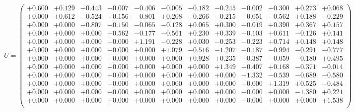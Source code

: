 \documentclass[9pt]{article}
\theoremstyle{plain}
\theoremstyle{definition}
\theoremstyle{remark}
\numberwithin{equation}{section}
\begin{document}
$U = \left(
\begin{array}{
cccccccccccc}
+0.600 & +0.129 & -0.443 & -0.007 & -0.406 & -0.005 & -0.182 & -0.245 & -0.002 & -0.300 & +0.273 & +0.068 \\
+0.000 & +0.612 & -0.524 & +0.156 & -0.801 & +0.208 & -0.266 & -0.215 & +0.051 & -0.562 & +0.188 & -0.229 \\
+0.000 & +0.000 & -0.807 & -0.150 & -0.065 & -0.128 & +0.065 & +0.300 & +0.019 & +0.390 & +0.367 & +0.157 \\
+0.000 & +0.000 & +0.000 & +0.562 & -0.177 & -0.561 & +0.230 & +0.339 & +0.103 & +0.611 & -0.126 & +0.141 \\
+0.000 & +0.000 & +0.000 & +0.000 & +1.191 & -0.228 & +0.030 & -0.253 & -0.223 & +0.714 & +0.148 & +0.148 \\
+0.000 & +0.000 & +0.000 & +0.000 & +0.000 & +1.079 & -0.516 & -1.207 & +0.187 & -0.994 & -0.291 & -0.777 \\
+0.000 & +0.000 & +0.000 & +0.000 & +0.000 & +0.000 & +0.928 & +0.235 & +0.387 & -0.059 & -0.180 & +0.495 \\
+0.000 & +0.000 & +0.000 & +0.000 & +0.000 & +0.000 & +0.000 & +1.349 & +0.407 & +0.168 & -0.371 & -0.014 \\
+0.000 & +0.000 & +0.000 & +0.000 & +0.000 & +0.000 & +0.000 & +0.000 & +1.332 & -0.539 & -0.689 & -0.580 \\
+0.000 & +0.000 & +0.000 & +0.000 & +0.000 & +0.000 & +0.000 & +0.000 & +0.000 & +1.319 & +0.525 & -0.484 \\
+0.000 & +0.000 & +0.000 & +0.000 & +0.000 & +0.000 & +0.000 & +0.000 & +0.000 & +0.000 & -1.380 & +0.221 \\
+0.000 & +0.000 & +0.000 & +0.000 & +0.000 & +0.000 & +0.000 & +0.000 & +0.000 & +0.000 & +0.000 & +1.538 \\
\end{array}
\right)$ \newline 
\end{document}
